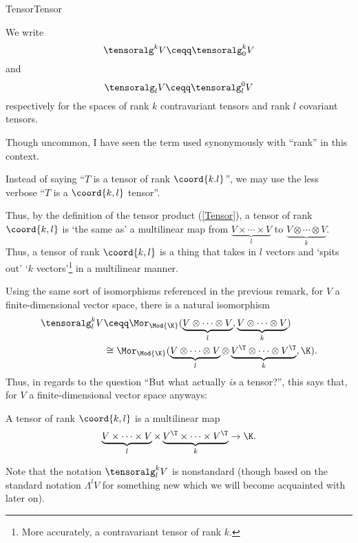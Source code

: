 \begin{dfn}{Tensor}{Tensor}
\begin{rmk}
		We write
		\begin{equation}
		\tensoralg ^kV\ceqq \tensoralg _0^kV
		\end{equation}
		and
		\begin{equation}
		\tensoralg _lV\ceqq \tensoralg _l^0V
		\end{equation}
		respectively for the spaces of rank $k$ contravariant tensors and rank $l$ covariant tensors.
	\end{rmk}
	\begin{rmk}
		Though uncommon, I have seen the term  used synonymously with ``rank'' in this context.
	\end{rmk}
	\begin{rmk}
		Instead of saying ``$T$ is a tensor of rank $\coord{k.l}$'', we may use the less verbose ``$T$ is a $\coord{k,l}$ tensor''.
	\end{rmk}
	\begin{rmk}
		Thus, by the definition of the tensor product (\cref{Tensor}), a tensor of rank $\coord{k,l}$ is `the same as' a multilinear map from $\underbrace{V\times \cdots \times V}_l$ to $\underbrace{V\otimes \cdots \otimes V}_k$.  Thus, a tensor of rank $\coord{k,l}$ is a thing that takes in $l$ vectors and `spits out' `$k$ vectors'\footnote{More accurately, a contravariant tensor of rank $k$.} in a multilinear manner.
	\end{rmk}
	\begin{rmk}
		Using the same sort of isomorphisms referenced in the previous remark, for $V$ a finite-dimensional vector space, there is a natural isomorphism
		\begin{equation*}
		\begin{split}
		\tensoralg _l^kV & \ceqq \Mor _{\Mod{\K}}(\underbrace{V\otimes \cdots \otimes V}_l,\underbrace{V\otimes \cdots \otimes V}_k) \\
		& \cong \Mor _{\Mod{\K}}(\underbrace{V\otimes \cdots \otimes V}_l\otimes \underbrace{V^{\T}\otimes \cdots \otimes V^{\T}}_k,\K ).
		\end{split}
		\end{equation*}
		Thus, in regards to the question ``But what actually \emph{is} a tensor?'', this says that, for $V$ a finite-dimensional vector space anyways:
		\begin{important}
			A tensor of rank $\coord{k,l}$ is a multilinear map
			\begin{equation*}
			\underbrace{V\times \cdots \times V}_l\times \underbrace{V^{\T}\times \cdots \times V^{\T}}_k\rightarrow \K .
			\end{equation*}
		\end{important}
	\end{rmk}
	\begin{rmk}
		Note that the notation $\tensoralg _l^kV$ is nonstandard (though based on the standard notation $\Lambda ^lV$ for something new which we will become acquainted with later on).
	\end{rmk}
\end{dfn}

